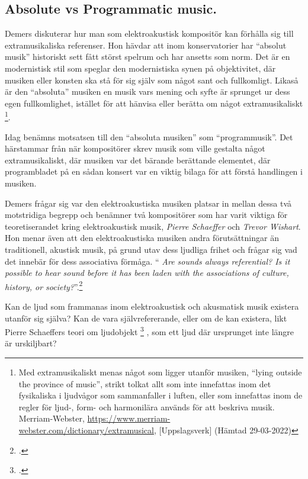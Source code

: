 \documentclass{article}
\begin{document}


\subsection{Absolute vs Programmatic music.}
Demers diskuterar hur man som elektroakustisk kompositör kan förhålla sig till extramusikaliska referenser.
Hon hävdar att inom konservatorier har ``absolut musik'' historiskt sett fått störst spelrum och har ansetts
som norm. Det är en modernistisk stil som speglar den modernistiska synen på objektivitet, där musiken eller
konsten ska stå för sig själv som något sant och fullkomligt. Likaså är den ``absoluta'' musiken en musik vars
mening och syfte är sprunget ur dess egen fullkomlighet, istället för att hänvisa eller berätta om något
extramusikaliskt \footnote{Med extramusikaliskt menas något som ligger utanför musiken, ``lying outside the
province of music'', strikt tolkat allt som inte innefattas inom det fysikaliska i ljudvågor som sammanfaller
i luften, eller som innefattas inom de regler för ljud-, form- och harmonilära används för att beskriva musik.
\\ Merriam-Webster, \url{https://www.merriam-webster.com/dictionary/extramusical}, [Uppslagsverk]
(Hämtad 29-03-2022)}.

Idag benämns motsatsen till den ``absoluta musiken'' som ``programmusik''. Det härstammar från när
kompositörer skrev musik som ville gestalta något extramusikaliskt, där musiken var det bärande berättande
elementet, där programbladet på en sådan konsert var en viktig bilaga för att förstå handlingen i musiken. 

Demers frågar sig var den elektroakustiska musiken platsar in mellan dessa två motstridiga begrepp och
benämner två kompositörer som har varit viktiga för teoretiserandet kring elektroakustisk musik, \emph{Pierre
Schaeffer} och \emph{Trevor Wishart}. Hon menar även att den elektroakustiska musiken andra förutsättningar än
traditionell, akustisk musik, på grund utav dess ljudliga frihet och frågar sig vad det innebär för dess
associativa förmåga. `` \emph{Are sounds always referential? Is it possible to hear sound before it has been
laden with the associations of culture, history, or society?}''.\footcite[23]{JoannaDemers}

Kan de ljud som frammanas inom elektroakustisk och akusmatisk musik existera utanför sig själva? Kan de vara
självrefererande, eller om de kan existera, likt Pierre Schaeffers teori om ljudobjekt
\footcite{PierreSchaeffer} , som ett ljud där ursprunget inte längre är urskiljbart?
\end{document}
